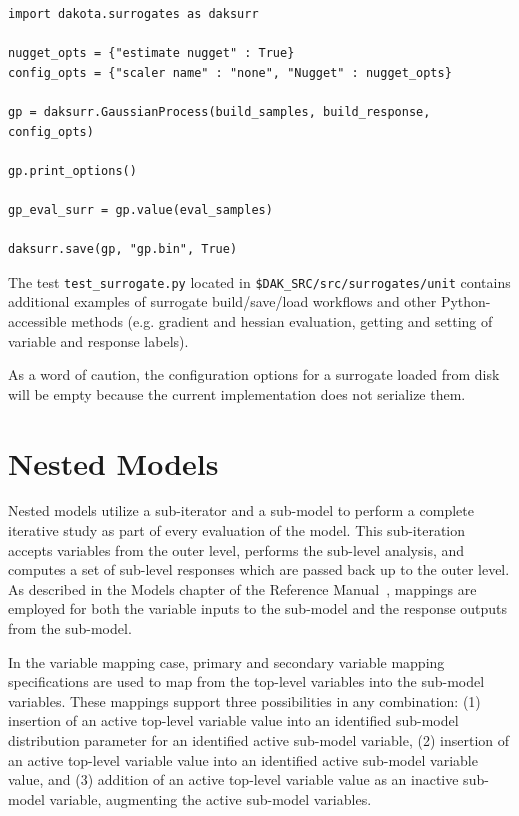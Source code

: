 \begin{verbatim}
import dakota.surrogates as daksurr

nugget_opts = {"estimate nugget" : True}
config_opts = {"scaler name" : "none", "Nugget" : nugget_opts}

gp = daksurr.GaussianProcess(build_samples, build_response, config_opts)

gp.print_options()

gp_eval_surr = gp.value(eval_samples)

daksurr.save(gp, "gp.bin", True)
\end{verbatim}

The test \texttt{test\_surrogate.py} located in
\texttt{\$DAK\_SRC/src/surrogates/unit} contains additional examples of
surrogate build/save/load workflows and other Python-accessible methods
(e.g. gradient and hessian evaluation, getting and setting of variable
and response labels).

As a word of caution, the configuration options for a surrogate loaded from
disk will be empty because the current implementation does not serialize
them.


\section{Nested Models} \label{models:nested}

Nested models utilize a sub-iterator and a sub-model to perform a
complete iterative study as part of every evaluation of the model.
This sub-iteration accepts variables from the outer level, performs
the sub-level analysis, and computes a set of sub-level responses
which are passed back up to the outer level.  As described in the
Models chapter of the Reference Manual~\cite{RefMan}, mappings are
employed for both the variable inputs to the sub-model and the
response outputs from the sub-model.

In the variable mapping case, primary and secondary variable
mapping specifications are used to map from the top-level variables
into the sub-model variables.  These mappings support three
possibilities in any combination: (1) insertion of an active top-level
variable value into an identified sub-model distribution parameter for
an identified active sub-model variable, (2) insertion of an active
top-level variable value into an identified active sub-model variable
value, and (3) addition of an active top-level variable value as an
inactive sub-model variable, augmenting the active sub-model
variables.


